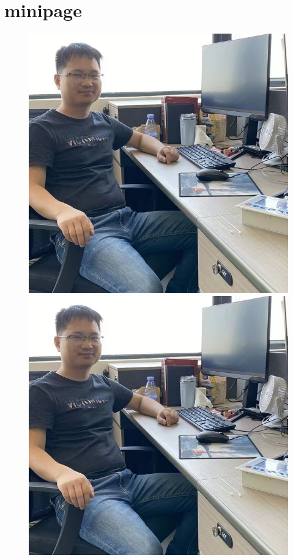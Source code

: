 \documentclass[DIV13,a4paper]{scrartcl}
\begin{document}
	\clearpage
	
	\section{minipage}
	\begin{figure}[!h]
		\vspace{0.3cm}
		\begin{center}
			\begin{minipage}{0.49\linewidth}
				\centerline{\includegraphics[width=1\linewidth]{ShowMe.jpg}}
			\end{minipage}
			\hfill
			\begin{minipage}{0.49\linewidth}
				\centerline{\includegraphics[width=1\linewidth]{ShowMe}}

\end{minipage}
\end{center}
\end{figure}
\end{document}
